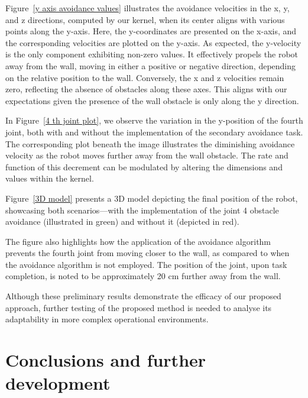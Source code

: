 \documentclass[a4paper]{article}
\begin{document}
Figure~\ref{y axis avoidance values} illustrates the avoidance velocities in the x, y, and z directions, computed by our kernel, when its center aligns with various points along the y-axis. Here, the y-coordinates are presented on the x-axis, and the corresponding velocities are plotted on the y-axis. As expected, the y-velocity is the only component exhibiting non-zero values. It effectively propels the robot away from the wall, moving in either a positive or negative direction, depending on the relative position to the wall. Conversely, the x and z velocities remain zero, reflecting the absence of obstacles along these axes. This aligns with our expectations given the presence of the wall obstacle is only along the y direction.

In Figure~\ref{4 th joint plot}, we observe the variation in the y-position of the fourth joint, both with and without the implementation of the secondary avoidance task. The corresponding plot beneath the image illustrates the diminishing avoidance velocity as the robot moves further away from the wall obstacle. The rate and function of this decrement can be modulated by altering the dimensions and values within the kernel.

Figure~\ref{3D model} presents a 3D model depicting the final position of the robot, showcasing both scenarios—with the implementation of the joint 4 obstacle avoidance (illustrated in green) and without it (depicted in red).

The figure also highlights how the application of the avoidance algorithm prevents the fourth joint from moving closer to the wall, as compared to when the avoidance algorithm is not employed. The position of the joint, upon task completion, is noted to be approximately 20 cm further away from the wall. 

Although these preliminary results demonstrate the efficacy of our proposed approach, further testing of the proposed method is needed to analyse  its adaptability in more complex operational environments.

\section{Conclusions and further development}
\end{document}
